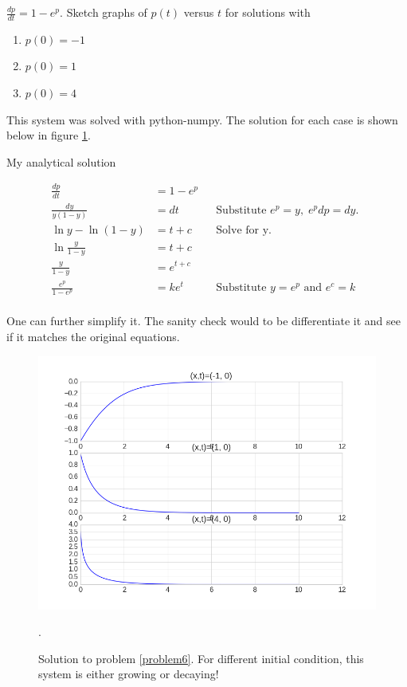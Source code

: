 \begin{questions}
\question[5]
\label{problem6}

$\frac{dp}{dt} = 1 - e^p$. Sketch graphs of $p(t)$ versus $t$ for solutions
with 
\begin{enumerate}
    \item $p(0) = -1 $
    \item $p(0) = 1 $
    \item $p(0) = 4 $
\end{enumerate}

\begin{solution}

    This system was solved with python-numpy. The solution for each case is
    shown below in figure \ref{fig:problem6}.

    My analytical solution

    \begin{align*}
        \frac{dp}{dt} &= 1 - e^p \\
        \frac{dy}{y(1-y)} &= dt && \text{Substitute $e^p=y, \; e^p dp = dy $. } \\
        \ln y - \ln (1-y) &= t + c && \text{Solve for y.} \\
        \ln \frac{y}{1-y} &= t + c \\
        \frac{y}{1-y} &= e^{t+c} \\
        \frac{e^p}{1-e^p} &= ke^t && \text{Substitute $y=e^p$ and $e^c=k$ } \\
    \end{align*}

    One can further simplify it. The sanity check would to be differentiate it
    and see if it matches the original equations.

\end{solution}

\begin{figure}[htpb]
    \centering
    \includegraphics[width=0.8\linewidth]{./solve_problem6_py.png}
    \caption{Solution to problem \ref{problem6}. For different initial
    condition, this system is either growing or decaying! }.
    \label{fig:problem6}
\end{figure}


\end{questions}
